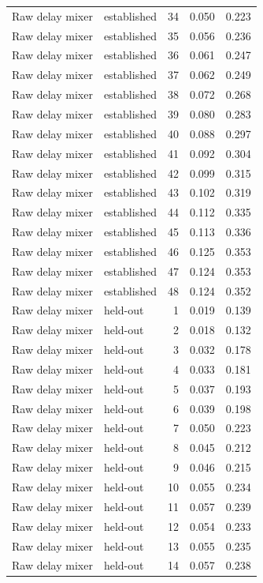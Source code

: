 \begin{tabular}{llrrr}
Raw delay mixer & established & 34 & 0.050 & 0.223 \\
Raw delay mixer & established & 35 & 0.056 & 0.236 \\
Raw delay mixer & established & 36 & 0.061 & 0.247 \\
Raw delay mixer & established & 37 & 0.062 & 0.249 \\
Raw delay mixer & established & 38 & 0.072 & 0.268 \\
Raw delay mixer & established & 39 & 0.080 & 0.283 \\
Raw delay mixer & established & 40 & 0.088 & 0.297 \\
Raw delay mixer & established & 41 & 0.092 & 0.304 \\
Raw delay mixer & established & 42 & 0.099 & 0.315 \\
Raw delay mixer & established & 43 & 0.102 & 0.319 \\
Raw delay mixer & established & 44 & 0.112 & 0.335 \\
Raw delay mixer & established & 45 & 0.113 & 0.336 \\
Raw delay mixer & established & 46 & 0.125 & 0.353 \\
Raw delay mixer & established & 47 & 0.124 & 0.353 \\
Raw delay mixer & established & 48 & 0.124 & 0.352 \\
Raw delay mixer & held-out & 1 & 0.019 & 0.139 \\
Raw delay mixer & held-out & 2 & 0.018 & 0.132 \\
Raw delay mixer & held-out & 3 & 0.032 & 0.178 \\
Raw delay mixer & held-out & 4 & 0.033 & 0.181 \\
Raw delay mixer & held-out & 5 & 0.037 & 0.193 \\
Raw delay mixer & held-out & 6 & 0.039 & 0.198 \\
Raw delay mixer & held-out & 7 & 0.050 & 0.223 \\
Raw delay mixer & held-out & 8 & 0.045 & 0.212 \\
Raw delay mixer & held-out & 9 & 0.046 & 0.215 \\
Raw delay mixer & held-out & 10 & 0.055 & 0.234 \\
Raw delay mixer & held-out & 11 & 0.057 & 0.239 \\
Raw delay mixer & held-out & 12 & 0.054 & 0.233 \\
Raw delay mixer & held-out & 13 & 0.055 & 0.235 \\
Raw delay mixer & held-out & 14 & 0.057 & 0.238 \\

\end{tabular}
